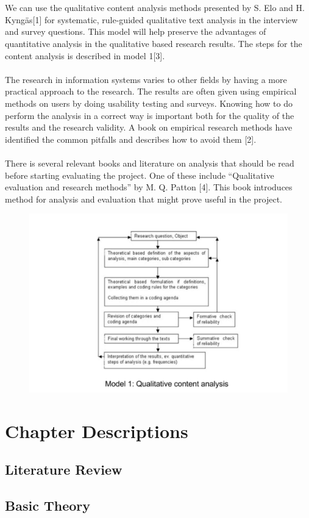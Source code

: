 \\\\
We can use the qualitative content analysis methods presented by S. Elo and H. Kyngäs[1] for systematic, rule-guided qualitative text analysis in the interview and survey questions. This model will help preserve the advantages of quantitative analysis in the qualitative based research results. The steps for the content analysis is described in model 1[3]. 
\\\\
The research in information systems varies to other fields by having a more practical approach to the research. The results are often given using empirical methods on users by doing usability testing and surveys. Knowing how to do perform the analysis in a correct way is important both for the quality of the results and the research validity. A book on empirical research methods have identified the common pitfalls and describes how to avoid them [2]. 
\\\\
There is several relevant books and literature on analysis that should be read before starting evaluating the project. One of these include “Qualitative evaluation and research methods” by M. Q. Patton [4]. This book introduces method for analysis and evaluation that might prove useful in the project. 

\begin{figure}
    \centering
    \includegraphics[width=\textwidth]{fig/method.png}
    \label{fig:my_label}
\end{figure}


\section{Chapter Descriptions}

\subsection{Literature Review}


\subsection{Basic Theory}




\cleardoublepage